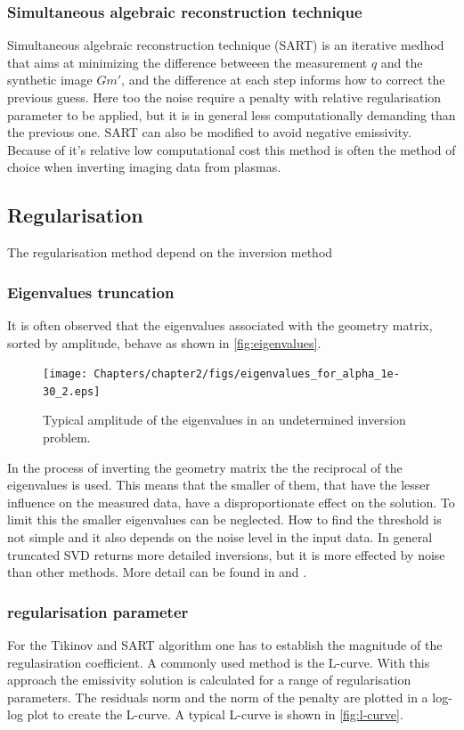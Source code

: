 \subsubsection{Simultaneous algebraic reconstruction technique}
Simultaneous algebraic reconstruction technique (SART) is an iterative medhod that aims at minimizing the difference betweeen the measurement $q$ and the synthetic image $Gm'$, and the difference at each step informs how to correct the previous guess. Here too the noise require a penalty with relative regularisation parameter to be applied, but it is in general less computationally demanding than the previous one. SART can also be modified to avoid negative emissivity. Because of it's relative low computational cost this method is often the method of choice when inverting imaging data from plasmas.

\subsection{Regularisation}
The regularisation method depend on the inversion method
\subsubsection{Eigenvalues truncation}
It is often observed that the eigenvalues associated with the geometry matrix, sorted by amplitude, behave as shown in \autoref{fig:eigenvalues}.

\begin{figure}
	\centering
	\texttt{[image: Chapters/chapter2/figs/eigenvalues\_for\_alpha\_1e-30\_2.eps]}
	\caption{Typical amplitude of the eigenvalues in an undetermined inversion problem.}
	\label{fig:eigenvalues}
\end{figure}

In the process of inverting the geometry matrix the the reciprocal of the eigenvalues is used. This means that the smaller of them, that have the lesser influence on the measured data, have a disproportionate effect on the solution. To limit this the smaller eigenvalues can be neglected. How to find the threshold is not simple and it also depends on the noise level in the input data. In general truncated SVD returns more detailed inversions, but it is more effected by noise than other methods. More detail can be found in \cite{Schou2015} and \cite{Widman2002}.

\subsubsection{regularisation parameter}
For the Tikinov and SART algorithm one has to establish the magnitude of the regulasiration coefficient. A commonly used method is the L-curve. With this approach the emissivity solution is calculated for a range of regularisation parameters. The residuals norm and the norm of the penalty are plotted in a log-log plot to create the L-curve. A typical L-curve is shown in \autoref{fig:l-curve}.

